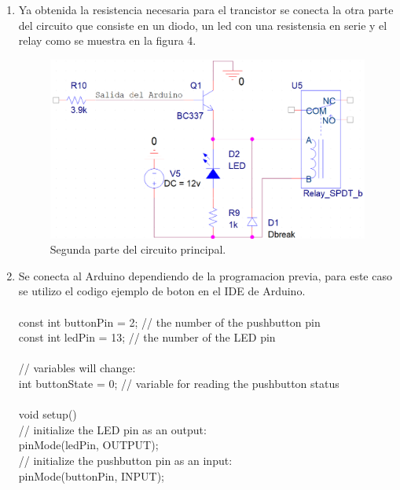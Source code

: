 \documentclass[letterpaper]{article}
\begin{document}
\begin{large}
\begin{enumerate}
\begin{large}
            \end{large}
        \item Ya obtenida la resistencia necesaria para el trancistor se conecta la otra parte del circuito que consiste en un diodo, un led con una resistensia en serie y el relay como se muestra en la figura 4.\\
        \newpage
        \begin{figure}
            \centering
            \includegraphics[scale=0.5]{IMG/cir2.png}
            \caption{Segunda parte del circuito principal.}
            \label{fig:cir2}
        \end{figure}
        \item Se conecta al Arduino dependiendo de la programacion previa, para este caso se utilizo el codigo ejemplo de boton en el IDE de Arduino.\\\\
        const int buttonPin = 2;     // the number of the pushbutton pin\\
        const int ledPin =  13;      // the number of the LED pin\\
        \\
        // variables will change:\\
        int buttonState = 0;         // variable for reading the pushbutton status\\
\\
        void setup() {\\
         // initialize the LED pin as an output:\\
         pinMode(ledPin, OUTPUT);\\
         // initialize the pushbutton pin as an input:\\
         pinMode(buttonPin, INPUT);\\
        }\\

\end{enumerate}
\end{large}
\end{document}
